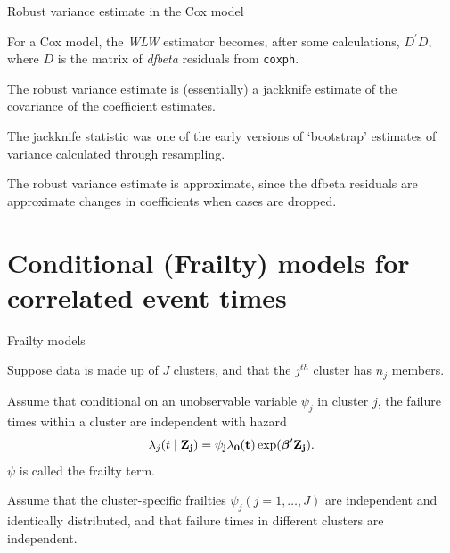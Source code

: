 \documentclass[ignorenonframetext,]{beamer}
\newcommand{\bbeta}{\mbox{\boldmath$\beta$}}
\newcommand{\bZ}{\bf Z}
\begin{document}
\begin{frame}{%
\protect\hypertarget{robust-variance-estimate-in-the-cox-model}{%
Robust variance estimate in the Cox model}}

For a Cox model, the \emph{WLW} estimator becomes, after some
calculations, \(D^\prime D\), where \(D\) is the matrix of \emph{dfbeta}
residuals from \texttt{coxph}.

The robust variance estimate is (essentially) a jackknife estimate of
the covariance of the coefficient estimates.

The jackknife statistic was one of the early versions of `bootstrap’
estimates of variance calculated through resampling.

The robust variance estimate is approximate, since the dfbeta residuals
are approximate changes in coefficients when cases are dropped.

\end{frame}

\hypertarget{conditional-frailty-models-for-correlated-event-times}{%
\section{Conditional (Frailty) models for correlated event
times}\label{conditional-frailty-models-for-correlated-event-times}}

\begin{frame}{%
\protect\hypertarget{frailty-models}{%
Frailty models}}

Suppose data is made up of \(J\) clusters, and that the \(j^{th}\)
cluster has \(n_j\) members.

Assume that conditional on an unobservable variable \(\psi_j\) in
cluster \(j\), the failure times within a cluster are independent with
hazard \[
        \lambda_j(t \mid \bZ_j) = \psi_j \lambda_0(t)
        \exp(\bbeta^\prime \bZ_j).
    \] \(\psi\) is called the frailty term.

Assume that the cluster-specific frailties \(\psi_j (j = 1,\dots,J)\)
are independent and identically distributed, and that failure times in
different clusters are independent.

\end{frame}
\end{document}
